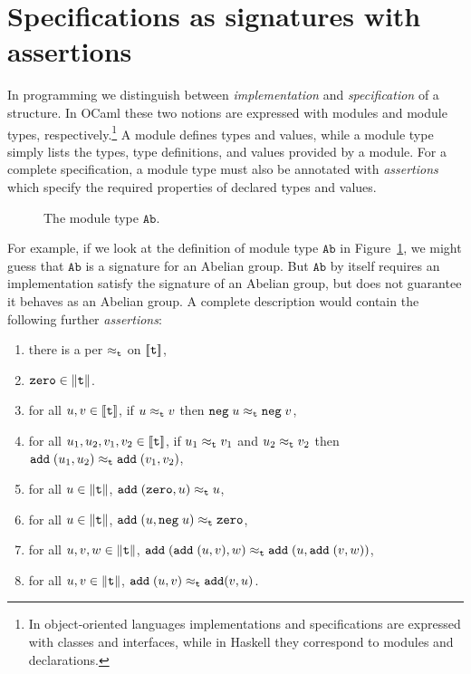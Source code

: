 \section{Specifications as signatures with assertions}
\label{sec:spec-sign-assert}


In programming we distinguish between \emph{implementation} and
\emph{specification} of a structure. In OCaml these two notions are
expressed with modules and module types, respectively.\footnote{In
  object-oriented languages implementations and specifications are
  expressed with classes and interfaces, while in Haskell they
  correspond to modules and declarations.} A module defines types and
values, while a module type simply lists the types, type definitions,
and values provided by a module. For a complete specification, a
module type must also be annotated with \emph{assertions} which
specify the required properties of declared types and values.
%
\begin{figure}[t]
  \centering
  \caption{The module type $\mathtt{Ab}$.}
  \label{fig:module-example}
\end{figure}
%
For example, if we look at the definition of module type $\mathtt{Ab}$
in Figure~\ref{fig:module-example}, we might guess 
that $\mathtt{Ab}$ is a signature for an Abelian group. 
%
But $\mathtt{Ab}$ by itself requires an implementation satisfy
the signature of an Abelian
group, but does not guarantee it behaves as an Abelian group.
A complete description would contain the
following further \emph{assertions}:
%
\begin{enumerate}
\item
  \label{enum:t-per}%
  there is a per $\approx_{\mathtt{t}}$ on $[\![\mathtt{t}]\!]$,
\item
  \label{enum:zero-total}%
  $\mathtt{zero} \in \|\mathtt{t}\|$.
\item
  \label{enum:neg-total}%
  for all $u, v \in [\![\mathtt{t}]\!]$, if $u \approx_{\mathtt{t}} v$ then
  $\mathtt{neg} \; u \approx_{\mathtt{t}} \mathtt{neg} \; v$,
\item
  \label{enum:add-total}%
  for all $u_1, u_2, v_1, v_2 \in [\![\mathtt{t}]\!]$, if $u_1
  \approx_{\mathtt{t}} v_1$ and $u_2 \approx_{\mathtt{t}} v_2$ then $\mathtt{add} \; (u_1,
  u_2) \approx_{\mathtt{t}} \mathtt{add} \; (v_1, v_2)$,
\item 
  \label{enum:ab-group-axiom-1}%
  for all $u \in \|\mathtt{t}\|$, $\mathtt{add} \;
  (\mathtt{zero}, u) \approx_{\mathtt{t}} u$,
\item
  \label{enum:ab-group-axiom-2}%
  for all $u \in \|\mathtt{t}\|$, $\mathtt{add} \; (u,
  \mathtt{neg} \; u) \approx_{\mathtt{t}} \mathtt{zero}$,
\item
  \label{enum:ab-group-axiom-3}%
  for all $u, v, w \in \|\mathtt{t}\|$, $\mathtt{add} \;
  (\mathtt{add} \; (u, v), w) \approx_{\mathtt{t}} \mathtt{add} \; (u,
  \mathtt{add} \; (v, w))$,
\item
  \label{enum:ab-group-axiom-4}%
  for all $u, v \in \|\mathtt{t}\|$, $\mathtt{add} \; (u, v)
  \approx_{\mathtt{t}} \mathtt{add} (v, u)$.
\end{enumerate}
